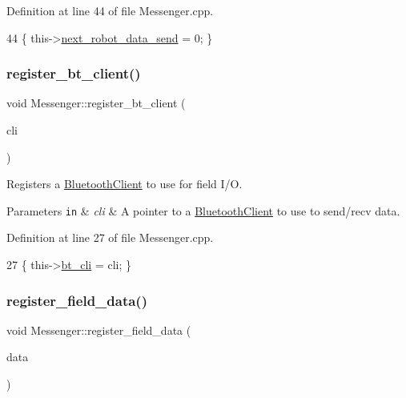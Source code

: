 Definition at line 44 of file Messenger.\+cpp.


\begin{DoxyCode}
44 \{ this->\hyperlink{class_messenger_af47b5f9743fcef4fdb73801ae7c6b023}{next\_robot\_data\_send} = 0; \}
\end{DoxyCode}
\mbox{\label{class_messenger_a8412ddd8931fa6b49a2ad3a2f52cad31}} 
\subsubsection{\texorpdfstring{register\+\_\+bt\+\_\+client()}{register\_bt\_client()}}
{\footnotesize\ttfamily void Messenger\+::register\+\_\+bt\+\_\+client (\begin{DoxyParamCaption}\item[{\hyperlink{class_bluetooth_client}{Bluetooth\+Client} $\ast$}]{cli }\end{DoxyParamCaption})}



Registers a \hyperlink{class_bluetooth_client}{Bluetooth\+Client} to use for field I/O. 


\begin{DoxyParams}[1]{Parameters}
\mbox{\tt in}  & {\em cli} & A pointer to a \hyperlink{class_bluetooth_client}{Bluetooth\+Client} to use to send/recv data. \\
\hline
\end{DoxyParams}


Definition at line 27 of file Messenger.\+cpp.


\begin{DoxyCode}
27 \{ this->\hyperlink{class_messenger_a481ed6f0554ddfb8441b7dc073f57ebd}{bt\_cli} = cli; \}
\end{DoxyCode}
\mbox{\label{class_messenger_a1416b79fce99fd7b1aa13d07113546a7}} 
\subsubsection{\texorpdfstring{register\+\_\+field\+\_\+data()}{register\_field\_data()}}
{\footnotesize\ttfamily void Messenger\+::register\+\_\+field\+\_\+data (\begin{DoxyParamCaption}\item[{\hyperlink{class_field_data}{Field\+Data} $\ast$}]{data }\end{DoxyParamCaption})}



